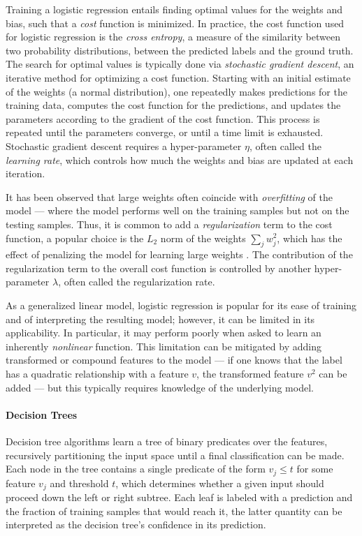 Training a logistic regression entails finding optimal values for the
weights and bias, such that a \emph{cost} function is minimized.
%
In practice, the cost function used for logistic regression is the
\emph{cross entropy}, a measure of the similarity between two
probability distributions, between the predicted labels and the ground
truth.
%
The search for optimal values is typically done via \emph{stochastic
  gradient descent}, an iterative method for optimizing a cost function.
%
Starting with an initial estimate of the weights (\eg a normal
distribution), one repeatedly makes predictions for the training data,
computes the cost function for the predictions, and updates the
parameters according to the gradient of the cost function.
%
This process is repeated until the parameters converge, or until a time
limit is exhausted.
%
Stochastic gradient descent requires a hyper-parameter $\eta$, often
called the \emph{learning rate}, which controls how much the weights and
bias are updated at each iteration.

It has been observed that large weights often coincide with
\emph{overfitting} of the model --- where the model performs well on the
training samples but not on the testing samples.
%
Thus, it is common to add a \emph{regularization} term to the cost
function, a popular choice is the $L_2$ norm of the weights
$\sum_j w_j^2$, which has the effect of penalizing the model for
learning large weights \citep{Park2008-no}.
%
The contribution of the regularization term to the overall cost function
is controlled by another hyper-parameter $\lambda$, often called the
regularization rate.

As a generalized linear model, logistic regression is popular for its
ease of training and of interpreting the resulting model; however, it
can be limited in its applicability.
%
In particular, it may perform poorly when asked to learn an inherently
\emph{nonlinear} function.
%
This limitation can be mitigated by adding transformed or compound
features to the model --- \eg if one knows that the label has a
quadratic relationship with a feature $v$, the transformed feature $v^2$
can be added --- but this typically requires knowledge of the underlying
model.


\paragraph{Decision Trees}
Decision tree algorithms learn a tree of binary predicates over the
features, recursively partitioning the input space until a final
classification can be made.
%
Each node in the tree contains a single predicate of the form
$v_j \leq t$ for some feature $v_j$ and threshold $t$, which determines
whether a given input should proceed down the left or right subtree.
%
Each leaf is labeled with a prediction and the fraction of training
samples that would reach it, the latter quantity can be interpreted as
the decision tree's confidence in its prediction.

